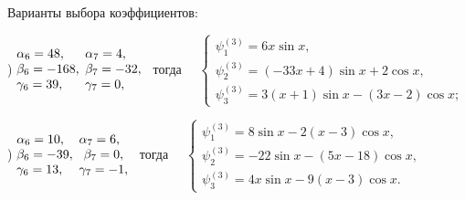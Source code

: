 \documentclass[11pt]{article}
\begin{document}
{\smallskip
Варианты выбора коэффициентов: 

) $\begin{matrix} \alpha_6 = 48,\hfill\\ \beta_6 = -168,\\ \gamma_6 = 39,\hfill \end{matrix}$
$\begin{matrix} \alpha_7 = 4,\hfill\\ \beta_7 = -32,\\ \gamma_7 = 0,\hfill \end{matrix}$ \ 
тогда \ \ $\begin{cases} 
\psi_1^{(3)} = 6x\sin x, \\
\psi_2^{(3)} = (-33x+4) \sin x + 2\cos x, \\
\psi_3^{(3)} = 3(x+1) \sin x - (3x-2) \cos x;
\end{cases}$

) $\begin{matrix} \alpha_6 = 10,\hfill\\ \beta_6 = -39,\\ \gamma_6 = 13,\hfill \end{matrix}$
$\begin{matrix} \alpha_7 = 6,\hfill\\ \beta_7 = 0,\\ \gamma_7 = -1,\hfill \end{matrix}$ \ 
тогда \ \ $\begin{cases} 
\psi_1^{(3)} = 8\sin x - 2(x-3)\cos x, \\
\psi_2^{(3)} = -22\sin x - (5x-18) \cos x, \\
\psi_3^{(3)} = 4x \sin x - 9(x - 3)\cos x.
\end{cases}$


}
\end{document}
